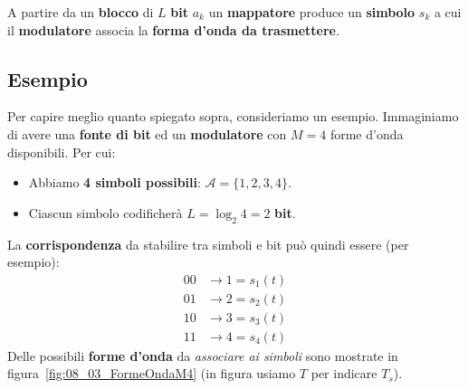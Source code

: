 \begin{remark}["PIPELINE" TX]
    A partire da un \textbf{blocco} di $L$ \textbf{bit} $a_k$ un
    \textbf{mappatore} produce un \textbf{simbolo} $s_k$ a
    cui il \textbf{modulatore} associa la \textbf{forma d'onda da trasmettere}.
\end{remark}

\subsection{Esempio}

Per capire meglio quanto spiegato sopra, consideriamo un esempio.
Immaginiamo di avere una \textbf{fonte di bit} ed un \textbf{modulatore}
con $M=4$ forme d'onda disponibili.
Per cui:
\begin{itemize}
    \item Abbiamo \textbf{4 simboli possibili}: $\mathcal{A}= \{1,2,3,4\}$.
    \item Ciascun simbolo codificherà $L=\log_{2}4 = 2$ \textbf{bit}.
\end{itemize}

La \textbf{corrispondenza} da stabilire tra simboli e bit
può quindi essere (per esempio):
\[
    \begin{aligned}
        00 &\to 1 = s_{1}(t) \\ 
        01 &\to 2 = s_{2}(t)\\ 
        10 &\to 3 = s_{3}(t)\\ 
        11 &\to 4 = s_{4}(t)
    \end{aligned}
\]
Delle possibili \textbf{forme d'onda} da \textit{associare ai simboli} sono
mostrate in figura~\ref{fig:08_03_FormeOndaM4} (in figura usiamo $T$ per indicare $T_s$).

